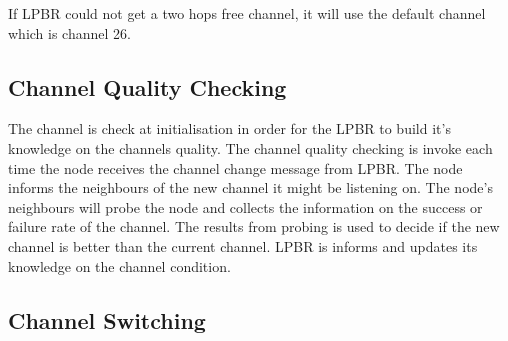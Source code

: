 If LPBR could not get a two hops free channel, it will use the default channel which is channel 26.


\subsection{Channel Quality Checking}

The channel is check at initialisation in order for the LPBR to build it's knowledge on the channels quality. The channel quality checking is invoke each time the node receives the channel change message from LPBR. The node informs the neighbours of the new channel it might be listening on. The node's neighbours will probe the node and collects the information on the success or failure rate of the channel. The results from probing is used to decide if the new channel is better than the current channel. LPBR is informs and updates its knowledge on the channel condition. 




\subsection{Channel Switching}


